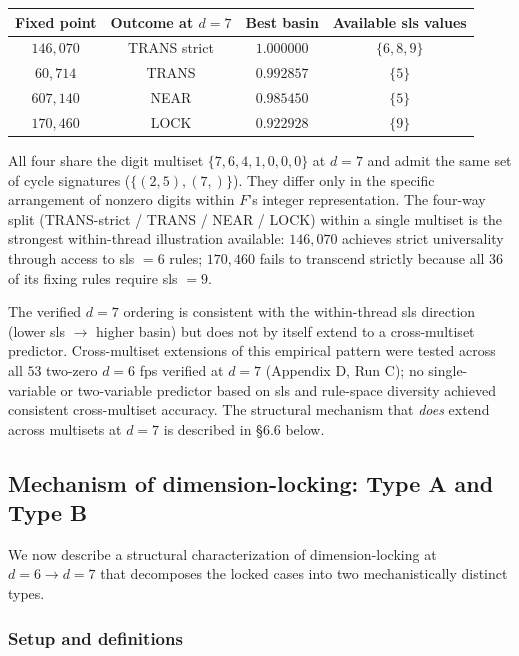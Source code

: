 \documentclass[11pt,letterpaper]{article}
\theoremstyle{paperstyle}
\theoremstyle{paperstyledef}
\theoremstyle{paperstylerem}
\begin{document}
\begin{longtable}[]{@{}cccc@{}}
\toprule\noalign{}
Fixed point & Outcome at \(d = 7\) & Best basin & Available sls
values \\
\midrule\noalign{}
\endhead
\bottomrule\noalign{}
\endlastfoot
\(146{,}070\) & TRANS strict & \(1.000000\) & \(\{6, 8, 9\}\) \\
\(60{,}714\) & TRANS & \(0.992857\) & \(\{5\}\) \\
\(607{,}140\) & NEAR & \(0.985450\) & \(\{5\}\) \\
\(170{,}460\) & LOCK & \(0.922928\) & \(\{9\}\) \\
\end{longtable}

All four share the digit multiset \(\{7, 6, 4, 1, 0, 0, 0\}\) at
\(d = 7\) and admit the same set of cycle signatures
(\(\{(2, 5), (7,)\}\)). They differ only in the specific arrangement of
nonzero digits within \(F\)'s integer representation. The four-way split
(TRANS-strict / TRANS / NEAR / LOCK) within a single multiset is the
strongest within-thread illustration available: \(146{,}070\) achieves
strict universality through access to sls \(= 6\) rules; \(170{,}460\)
fails to transcend strictly because all \(36\) of its fixing rules
require sls \(= 9\).

The verified \(d = 7\) ordering is consistent with the within-thread sls
direction (lower sls \(\to\) higher basin) but does not by itself extend
to a cross-multiset predictor. Cross-multiset extensions of this
empirical pattern were tested across all \(53\) two-zero \(d = 6\) fps
verified at \(d = 7\) (Appendix D, Run C); no single-variable or
two-variable predictor based on sls and rule-space diversity achieved
consistent cross-multiset accuracy. The structural mechanism that
\emph{does} extend across multisets at \(d = 7\) is described in §6.6
below.

\hypertarget{mechanism-of-dimension-locking-type-a-and-type-b}{%
\subsection{Mechanism of dimension-locking: Type A and Type B}\label{mechanism-of-dimension-locking-type-a-and-type-b}}

We now describe a structural characterization of dimension-locking at
\(d = 6 \to d = 7\) that decomposes the locked cases into two
mechanistically distinct types.

\hypertarget{setup-and-definitions}{%
\subsubsection{Setup and definitions}\label{setup-and-definitions}}
\end{document}

